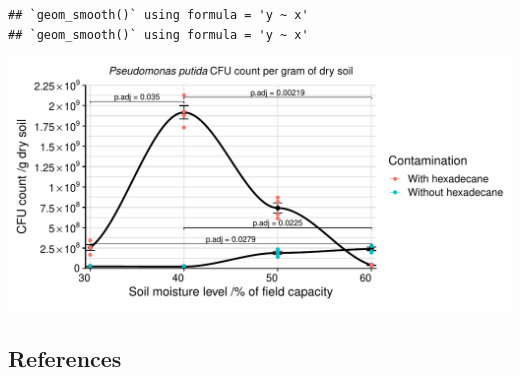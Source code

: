 \documentclass[
]{article}
\begin{document}
\begin{verbatim}
## `geom_smooth()` using formula = 'y ~ x'
## `geom_smooth()` using formula = 'y ~ x'
\end{verbatim}

\includegraphics{analysis_files/figure-latex/visualise-group3-1.pdf}

\subsection{References}\label{references}
\end{document}
